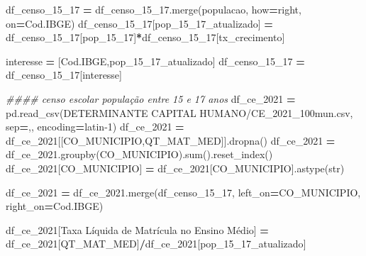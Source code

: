 \documentclass[
  12,
  dvipsnames]{article}
\newenvironment{Shaded}{\begin{snugshade}}{\end{snugshade}}
\newcommand{\BuiltInTok}[1]{#1}
\newcommand{\CommentTok}[1]{\textcolor[rgb]{0.56,0.35,0.01}{\textit{#1}}}
\newcommand{\NormalTok}[1]{#1}
\newcommand{\OperatorTok}[1]{\textcolor[rgb]{0.81,0.36,0.00}{\textbf{#1}}}
\newcommand{\StringTok}[1]{\textcolor[rgb]{0.31,0.60,0.02}{#1}}
\begin{document}
\begin{Shaded}
\begin{Highlighting}[]
\NormalTok{df\_censo\_15\_17 }\OperatorTok{=}\NormalTok{ df\_censo\_15\_17.merge(populacao, how}\OperatorTok{=}\StringTok{\textquotesingle{}right\textquotesingle{}}\NormalTok{, on}\OperatorTok{=}\StringTok{\textquotesingle{}Cod.IBGE\textquotesingle{}}\NormalTok{)}
\NormalTok{df\_censo\_15\_17[}\StringTok{\textquotesingle{}pop\_15\_17\_atualizado\textquotesingle{}}\NormalTok{] }\OperatorTok{=}\NormalTok{ df\_censo\_15\_17[}\StringTok{\textquotesingle{}pop\_15\_17\textquotesingle{}}\NormalTok{]}\OperatorTok{*}\NormalTok{df\_censo\_15\_17[}\StringTok{\textquotesingle{}tx\_crecimento\textquotesingle{}}\NormalTok{]}

\NormalTok{interesse }\OperatorTok{=}\NormalTok{ [}\StringTok{\textquotesingle{}Cod.IBGE\textquotesingle{}}\NormalTok{,}\StringTok{\textquotesingle{}pop\_15\_17\_atualizado\textquotesingle{}}\NormalTok{]}
\NormalTok{df\_censo\_15\_17 }\OperatorTok{=}\NormalTok{ df\_censo\_15\_17[interesse]}

\CommentTok{\#\#\#\# censo escolar população entre 15 e 17 anos}
\NormalTok{df\_ce\_2021 }\OperatorTok{=}\NormalTok{ pd.read\_csv(}\StringTok{\textquotesingle{}DETERMINANTE CAPITAL HUMANO/CE\_2021\_100mun.csv\textquotesingle{}}\NormalTok{,}
\NormalTok{                         sep}\OperatorTok{=}\StringTok{\textquotesingle{},\textquotesingle{}}\NormalTok{, encoding}\OperatorTok{=}\StringTok{\textquotesingle{}latin{-}1\textquotesingle{}}\NormalTok{)}
\NormalTok{df\_ce\_2021 }\OperatorTok{=}\NormalTok{ df\_ce\_2021[[}\StringTok{\textquotesingle{}CO\_MUNICIPIO\textquotesingle{}}\NormalTok{,}\StringTok{\textquotesingle{}QT\_MAT\_MED\textquotesingle{}}\NormalTok{]].dropna()}
\NormalTok{df\_ce\_2021 }\OperatorTok{=}\NormalTok{ df\_ce\_2021.groupby(}\StringTok{\textquotesingle{}CO\_MUNICIPIO\textquotesingle{}}\NormalTok{).}\BuiltInTok{sum}\NormalTok{().reset\_index()}
\NormalTok{df\_ce\_2021[}\StringTok{\textquotesingle{}CO\_MUNICIPIO\textquotesingle{}}\NormalTok{] }\OperatorTok{=}\NormalTok{ df\_ce\_2021[}\StringTok{\textquotesingle{}CO\_MUNICIPIO\textquotesingle{}}\NormalTok{].astype(}\BuiltInTok{str}\NormalTok{)}

\NormalTok{df\_ce\_2021 }\OperatorTok{=}\NormalTok{ df\_ce\_2021.merge(df\_censo\_15\_17, left\_on}\OperatorTok{=}\StringTok{\textquotesingle{}CO\_MUNICIPIO\textquotesingle{}}\NormalTok{,}
\NormalTok{                              right\_on}\OperatorTok{=}\StringTok{\textquotesingle{}Cod.IBGE\textquotesingle{}}\NormalTok{)}

\NormalTok{df\_ce\_2021[}\StringTok{\textquotesingle{}Taxa Líquida de Matrícula no Ensino Médio\textquotesingle{}}\NormalTok{] }\OperatorTok{=}\NormalTok{ df\_ce\_2021[}\StringTok{\textquotesingle{}QT\_MAT\_MED\textquotesingle{}}\NormalTok{]}\OperatorTok{/}\NormalTok{df\_ce\_2021[}\StringTok{\textquotesingle{}pop\_15\_17\_atualizado\textquotesingle{}}\NormalTok{]}


\end{Highlighting}
\end{Shaded}
\end{document}
